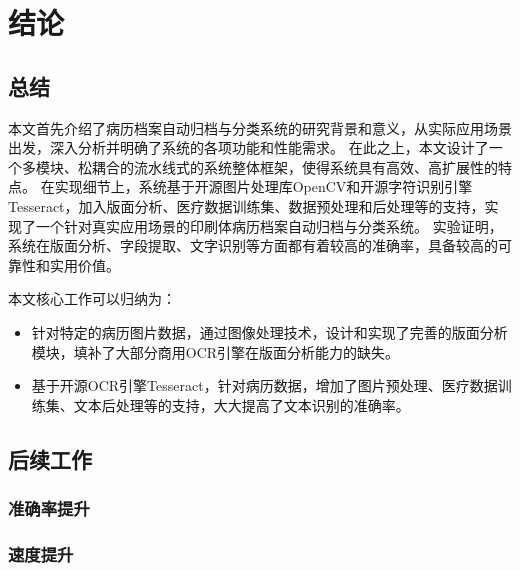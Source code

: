 \chapter{结论}
\label{chap:conclusion}
\section*{总结}
本文首先介绍了病历档案自动归档与分类系统的研究背景和意义，从实际应用场景出发，深入分析并明确了系统的各项功能和性能需求。
在此之上，本文设计了一个多模块、松耦合的流水线式的系统整体框架，使得系统具有高效、高扩展性的特点。
在实现细节上，系统基于开源图片处理库OpenCV和开源字符识别引擎Tesseract，加入版面分析、医疗数据训练集、数据预处理和后处理等的支持，实现了一个针对真实应用场景的印刷体病历档案自动归档与分类系统。
实验证明，系统在版面分析、字段提取、文字识别等方面都有着较高的准确率，具备较高的可靠性和实用价值。

本文核心工作可以归纳为：
\begin{itemize}
  \item 针对特定的病历图片数据，通过图像处理技术，设计和实现了完善的版面分析模块，填补了大部分商用OCR引擎在版面分析能力的缺失。
  \item 基于开源OCR引擎Tesseract，针对病历数据，增加了图片预处理、医疗数据训练集、文本后处理等的支持，大大提高了文本识别的准确率。
\end{itemize}
\section*{后续工作}
\subsection*{准确率提升}
\subsection*{速度提升}
